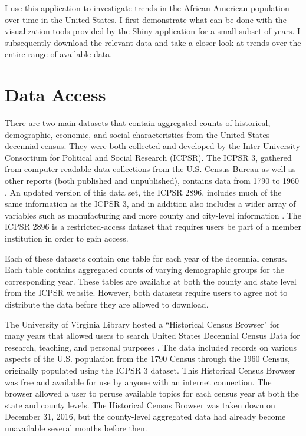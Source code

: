 \documentclass[DIV=calc, paper=a4, fontsize=10pt, twocolumn]{scrartcl}\usepackage[]{graphicx}\usepackage[]{color}
\begin{document}
\par I use this application to investigate trends in the African American population over time in the United States. I first demonstrate what can be done with the visualization tools provided by the Shiny application for a small subset of years. I subsequently download the relevant data and take a closer look at trends over the entire range of available data.  


\section*{Data Access}

\par There are two main datasets that contain aggregated counts of historical, demographic, economic, and social characteristics from the United States decennial census. They were both collected and developed by the Inter-University Consortium for Political and Social Research (ICPSR). The ICPSR 3, gathered from computer-readable data collections from the U.S. Census Bureau as well as other reports (both published and unpublished), contains data from 1790 to 1960 \citep{ICPSR-3}. An updated version of this data set, the ICPSR 2896, includes much of the same information as the ICPSR 3, and in addition also includes a wider array of variables such as manufacturing and more county and city-level information \citep{ICPSR-2896}. The ICPSR 2896 is a restricted-access dataset that requires users be part of a member institution in order to gain access.  

\par Each of these datasets contain one table for each year of the decennial census. Each table contains aggregated counts of varying demographic groups for the corresponding year. These tables are available at both the county and state level from the ICPSR website. However, both datasets require users to agree not to distribute the data before they are allowed to download.  

\par The University of Virginia Library hosted a ``Historical Census Browser" for many years that allowed users to search United States Decennial Census Data for research, teaching, and personal purposes \citep{HCB}. The data included records on various aspects of the U.S. population from the 1790 Census through the 1960 Census, originally populated using the ICPSR 3 dataset. This Historical Census Browser was free and available for use by anyone with an internet connection. The browser allowed a user to peruse available topics for each census year at both the state and county levels. The Historical Census Browser was taken down on December 31, 2016, but the county-level aggregated data had already become unavailable several months before then.  
\end{document}
